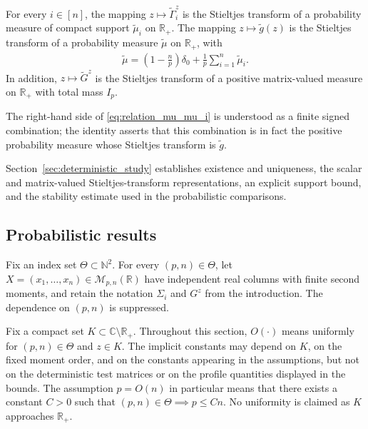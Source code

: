 \documentclass[EJP, preprint, NODS, nobera, nofontexpansion]{ejpecp}
\begin{document}
\begin{theorem}\label{the:g_tilde_stieltjes}
  For every $i\in[n]$, the mapping
  $z\mapsto\tilde\Gamma_i^z$ is the Stieltjes transform of a probability
  measure of compact support $\tilde\mu_i$ on $\mathbb R_+$.  The mapping
  $z\mapsto\tilde g(z)$ is the Stieltjes transform of a probability measure
  $\tilde\mu$ on $\mathbb R_+$, with
  \begin{align}\label{eq:relation_mu_mu_i}
      \tilde\mu
      =\left(1-\frac np\right)\delta_0
       +\frac1p\sum_{i=1}^n\tilde\mu_i.    
  \end{align}
  In addition, $z\mapsto\tilde G^z$ is the Stieltjes transform of a positive
  matrix-valued measure on $\mathbb R_+$ with total mass $I_p$.
\end{theorem}
  The right-hand side of \eqref{eq:relation_mu_mu_i} is understood as a finite signed combination; the
  identity asserts that this combination is in fact the positive probability
  measure whose Stieltjes transform is $\tilde g$.

Section~\ref{sec:deterministic_study} establishes existence and
uniqueness, the scalar and matrix-valued Stieltjes-transform representations,
an explicit support bound, and the stability estimate used in the
probabilistic comparisons.

\subsection{Probabilistic results}
\label{sse:main_probabilistic_results}
Fix an index set $\Theta\subset\mathbb N^2$.  For every
$(p,n)\in\Theta$, let $X=(x_1,\ldots,x_n)\in \mathcal M_{p,n}(\mathbb R)$ have independent real columns
with finite second moments, and retain the notation $\Sigma_i$ and $G^z$ from the introduction.  The dependence on $(p,n)$ is suppressed.

Fix a compact set $K\subset\mathbb C\setminus\mathbb R_+$. Throughout this section, $O(\cdot)$
means uniformly for $(p,n)\in\Theta$ and $z\in K$. The implicit constants
may depend on $K$, on the fixed moment order, and on the constants appearing
in the assumptions, but not on the deterministic test matrices or on the
profile quantities displayed in the bounds. The
assumption $p=O(n)$ in particular means that there exists a constant $C>0$ such that $(p,n)\in \Theta \implies p\leq Cn$. No uniformity is
claimed as $K$ approaches $\mathbb R_+$.
\end{document}
